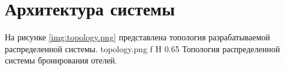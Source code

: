 \section{Архитектура системы}
На рисунке \ref{img:topology.png} представлена топология разрабатываемой распределенной системы.
{topology.png}
{f}
{H}
{0.65\textheight}
{Топология распределенной системы бронирования отелей.}